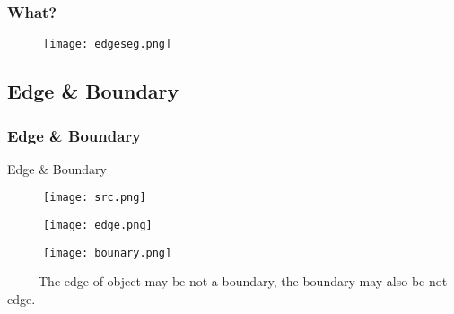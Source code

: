 \documentclass[notheorems,serif,table,compress]{beamer}  %
\begin{document}


\begin{frame}[fragile]
\frametitle{What?}
    \begin{figure}
    \texttt{[image: edgeseg.png]} 
    \end{figure}
\end{frame}



\subsection{Edge \& Boundary}
\begin{frame}
\frametitle{Edge \& Boundary}
{\color{blue}Edge \& Boundary}
    \begin{figure}
    \begin{minipage}[t]{0.3\linewidth}
    \centering
    \texttt{[image: src.png]} 
    \end{minipage}
    \begin{minipage}[t]{0.3\linewidth}
    \centering
    \texttt{[image: edge.png]} 
    \end{minipage}
    \begin{minipage}[t]{0.3\linewidth}
    \centering
    \texttt{[image: bounary.png]} 
    \end{minipage}
    \end{figure}

~~~~~The edge of object may be not a boundary, the boundary may also be not edge.
\end{frame}
 
 
\end{document}
